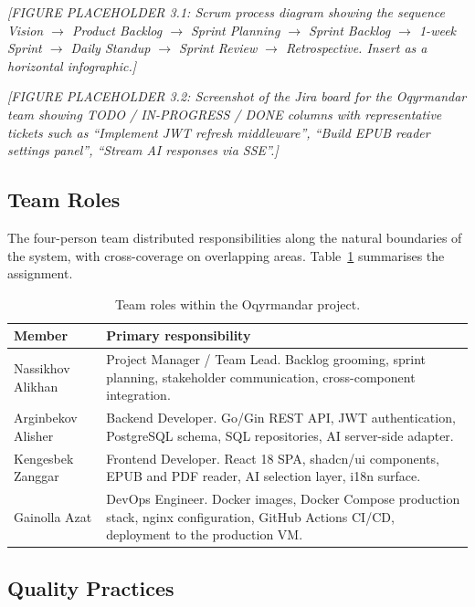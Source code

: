 \documentclass[12pt,a4paper]{report}
\begin{document}
\textit{[FIGURE PLACEHOLDER 3.1: Scrum process diagram showing the
sequence Vision $\to$ Product Backlog $\to$ Sprint Planning $\to$ Sprint
Backlog $\to$ 1-week Sprint $\to$ Daily Standup $\to$ Sprint Review $\to$
Retrospective. Insert as a horizontal infographic.]}

\textit{[FIGURE PLACEHOLDER 3.2: Screenshot of the Jira board for the
Oqyrmandar team showing TODO / IN-PROGRESS / DONE columns with
representative tickets such as ``Implement JWT refresh middleware'',
``Build EPUB reader settings panel'', ``Stream AI responses via SSE''.]}

\subsection{Team Roles}

The four-person team distributed responsibilities along the natural
boundaries of the system, with cross-coverage on overlapping areas.
Table~\ref{tab:roles} summarises the assignment.

\begin{table}[H]
\centering
\caption{Team roles within the Oqyrmandar project.}
\label{tab:roles}
\small
\begin{tabularx}{\textwidth}{l X}
\toprule
\textbf{Member} & \textbf{Primary responsibility} \\
\midrule
Nassikhov Alikhan  & Project Manager / Team Lead. Backlog grooming,
sprint planning, stakeholder communication, cross-component integration. \\
Arginbekov Alisher & Backend Developer. Go/Gin REST API, JWT
authentication, PostgreSQL schema, SQL repositories, AI server-side
adapter. \\
Kengesbek Zanggar  & Frontend Developer. React 18 SPA, shadcn/ui
components, EPUB and PDF reader, AI selection layer, i18n surface. \\
Gainolla Azat      & DevOps Engineer. Docker images, Docker Compose
production stack, nginx configuration, GitHub Actions CI/CD, deployment
to the production VM. \\
\bottomrule
\end{tabularx}
\end{table}

\subsection{Quality Practices}
\end{document}
